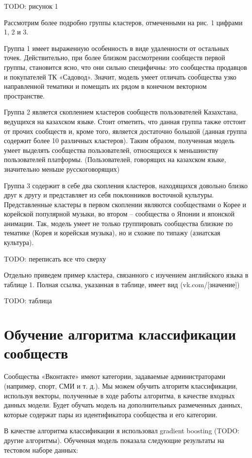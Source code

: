 \documentclass[times,specification,annotation]{itmo-student-thesis}
\begin{document}
TODO: рисунок 1

Рассмотрим более подробно группы кластеров, отмеченными на рис. 1
цифрами 1, 2 и 3.

Группа 1 имеет выраженную особенность в виде удаленности от остальных
точек. Действительно, при более близком рассмотрении сообществ первой группы,
становится ясно, что они сильно специфичны: это сообщества продавцов и
покупателей ТК «Садовод». Значит, модель умеет отличать сообщества узко
направленной тематики и помещать их рядом в конечном векторном пространстве.

Группа 2 является скоплением кластеров сообществ пользователей
Казахстана, ведущихся на казахском языке. Стоит отметить, что данная группа
также отстоит от прочих сообществ и, кроме того, является достаточно большой
(данная группа содержит более 10 различных кластеров). Таким образом,
полученная модель умеет выделять сообщества пользователей, относящихся к
меньшинству пользователей платформы. (Пользователей, говорящих на казахском
языке, значительно меньше русскоговорящих)

Группа 3 содержит в себе два скопления кластеров, находящихся довольно
близко друг к другу и представляет из себя поклонников восточной культуры.
Представленные кластеры в первом скоплении являются сообществами о Корее и
корейской популярной музыки, во втором – сообщества о Японии и японской
анимации. Так, модель умеет не только группировать сообщества близкие по
тематике (Корея и корейская музыка), но и схожие по типажу (азиатская культура).

TODO: переписать все что сверху

Отдельно приведем пример кластера, связанного с изучением английского
языка в таблице 1. Полная ссылка, указанная в таблице, имеет вид
(vk.com/[значение])

TODO: таблица

\section{Обучение алгоритма классификации сообществ}

Сообщества «Вконтакте» имеют категории, задаваемые администраторами
(например, спорт, СМИ и т. д.). Мы можем обучить алгоритм классификации,
используя векторы, полученные в ходе работы алгоритма, в качестве входных
данных модели. Будет обучать модель на дополнительных размеченных данных,
которые содержат пары из идентификатора сообщества и его категории.

В качестве алгоритма классификации я использовал gradient boosting (TODO:
другие алгоритмы). Обученная модель показала следующие
результаты на тестовом наборе данных:
\end{document}
